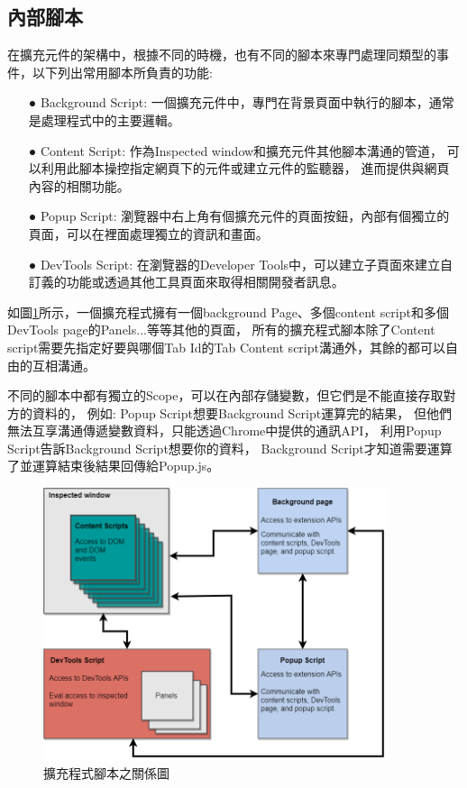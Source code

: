 \subsection{內部腳本}\label{s2.6.3}
在擴充元件的架構中，根據不同的時機，也有不同的腳本來專門處理同類型的事件，以下列出常用腳本所負責的功能:
\begin{itemize}
    \item[●] Background Script: 一個擴充元件中，專門在背景頁面中執行的腳本，通常是處理程式中的主要邏輯。
    \item[●] Content Script: 作為Inspected window和擴充元件其他腳本溝通的管道，
    可以利用此腳本操控指定網頁下的元件或建立元件的監聽器，
    進而提供與網頁內容的相關功能。
    \item[●] Popup Script: 瀏覽器中右上角有個擴充元件的頁面按鈕，內部有個獨立的頁面，可以在裡面處理獨立的資訊和畫面。
    \item[●] DevTools Script: 在瀏覽器的Developer Tools中，可以建立子頁面來建立自訂義的功能或透過其他工具頁面來取得相關開發者訊息。
\end{itemize}

如圖\ref{f2.5}所示，一個擴充程式擁有一個background Page、多個content script和多個DevTools page的Panels...等等其他的頁面，
所有的擴充程式腳本除了Content script需要先指定好要與哪個Tab Id的Tab Content script溝通外，其餘的都可以自由的互相溝通。

不同的腳本中都有獨立的Scope，可以在內部存儲變數，但它們是不能直接存取對方的資料的，
例如:
Popup Script想要Background Script運算完的結果，
但他們無法互享溝通傳遞變數資料，只能透過Chrome中提供的通訊API，
利用Popup Script告訴Background Script想要你的資料，
Background Script才知道需要運算了並運算結束後結果回傳給Popup.js。

\indent
\begin{figure}[H]
    \centering
    \includegraphics[width=0.9\textwidth]{picture/ch2-extension-script-relation.png}
    \caption{擴充程式腳本之關係圖}
    \label{f2.5}
\end{figure}